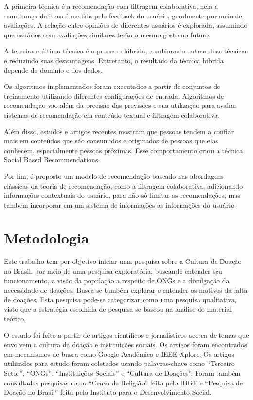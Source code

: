 \documentclass[conference]{IEEEtran}
\begin{document}
A primeira técnica é a recomendação com filtragem colaborativa, nela a semelhança de itens é medida pelo feedback do usuário, geralmente por meio de avaliações. A relação entre opiniões de diferentes usuários é explorada, assumindo que usuários com avaliações similares terão o mesmo gosto no futuro. \cite{sharma2013survey}

A terceira e última técnica é o processo híbrido, combinando outras duas técnicas e reduzindo suas desvantagens. Entretanto, o resultado da técnica hibrida depende do domínio e dos dados. \cite{ccano2017hybrid}

Os algoritmos implementados foram executados a partir de conjuntos de treinamento utilizando diferentes configurações de entrada. Algoritmos de recomendação vão além da precisão das previsões e sua utilização para avaliar sistemas de recomendação em conteúdo textual e filtragem colaborativa. 

Além disso, estudos e artigos recentes mostram que pessoas tendem a confiar mais em conteúdos que são consumidos e originados de pessoas que elas conhecem, especialmente pessoas próximas. Esse comportamento criou a técnica Social Based Recommendations. \cite{grava2021sistema}

Por fim, é proposto um modelo de recomendação baseado nas abordagens clássicas da teoria de recomendação, como a filtragem colaborativa, adicionando informações contextuais do usuário, para não só limitar as recomendações, mas também incorporar em um sistema de informações as informações do usuário. \cite{avancini2016sistema}


\section{Metodologia}

Este trabalho tem por objetivo iniciar uma pesquisa sobre a Cultura de Doação no Brasil, por meio de uma pesquisa exploratória, buscando entender seu funcionamento, a visão da população a respeito de ONGs e a divulgação da necessidade de doações. Busca-se também explorar e entender os motivos da falta de doações. Esta pesquisa pode-se categorizar como uma pesquisa qualitativa, visto que a estratégia escolhida de pesquisa se baseou na análise do material teórico.

O estudo foi feito a partir de artigos científicos e jornalísticos acerca de temas que envolvem a cultura da doação e instituições sociais. Os artigos foram encontrados em mecanismos de busca como Google Acadêmico e IEEE Xplore. Os artigos utilizados para estudo foram coletados usando palavras-chave como “Terceiro Setor”, “ONGs”, “Instituições Sociais” e “Cultura de Doações”. Foram também consultadas pesquisas como “Censo de Religião” feita pelo IBGE e “Pesquisa de Doação no Brasil” feita pelo Instituto para o Desenvolvimento Social.
\end{document}
